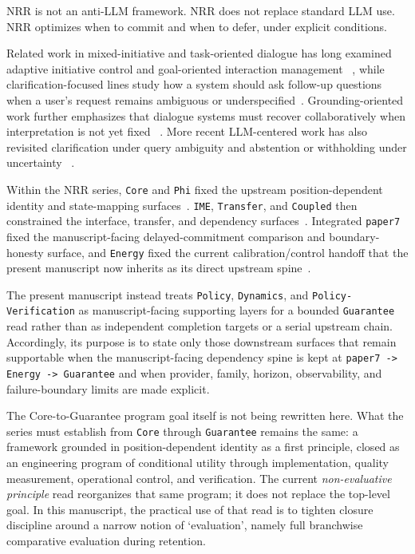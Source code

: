 \documentclass[11pt]{article}
\begin{document}
NRR is not an anti-LLM framework. NRR does not replace standard LLM use. NRR
optimizes when to commit and when to defer, under explicit conditions.

Related work in mixed-initiative and task-oriented dialogue has long examined
adaptive initiative control and goal-oriented interaction management
~\cite{chucarroll2000mimic,wen2017taskdialogue}, while clarification-focused lines
study how a system should ask follow-up questions when a user's request remains
ambiguous or underspecified~\cite{deboni2003clarification,rao2018evpi,hu2020interactive}. Grounding-oriented work further emphasizes that dialogue systems
must recover collaboratively when interpretation is not yet fixed
~\cite{benotti2021groundedclarifications,benotti2021grounding}. More recent
LLM-centered work has also revisited clarification under query ambiguity and
abstention or withholding under uncertainty
~\cite{sahay-etal-2025-ask,wen-etal-2025-know,madhusudhan-etal-2025-llms}.

Within the NRR series, \texttt{Core} and \texttt{Phi} fixed the upstream
position-dependent identity and state-mapping surfaces~\cite{saito2025nrr,saito2026phi}.
\texttt{IME}, \texttt{Transfer}, and \texttt{Coupled} then constrained the
interface, transfer, and dependency surfaces~\cite{saito2026ime,saito2026transfer,saito2026coupled}.
Integrated \texttt{paper7} fixed the manuscript-facing delayed-commitment
comparison and boundary-honesty surface, and \texttt{Energy} fixed the current
calibration/control handoff that the present manuscript now inherits as its
direct upstream spine~\cite{saito2026principles,saito2026energy}.

The present manuscript instead treats \texttt{Policy}, \texttt{Dynamics}, and
\texttt{Policy-Verification} as manuscript-facing supporting layers for a
bounded \texttt{Guarantee} read rather than as independent completion targets
or a serial upstream chain. Accordingly, its purpose is to state only those
downstream surfaces that remain supportable when the manuscript-facing
dependency spine is kept at \texttt{paper7 -> Energy -> Guarantee} and when
provider, family, horizon, observability, and failure-boundary limits are made
explicit.

The Core-to-Guarantee program goal itself is not being rewritten here. What the
series must establish from \texttt{Core} through \texttt{Guarantee} remains the
same: a framework grounded in position-dependent identity as a first principle,
closed as an engineering program of conditional utility through
implementation, quality measurement, operational control, and verification. The
current \textit{non-evaluative principle} read reorganizes that same program; it
does not replace the top-level goal. In this manuscript, the practical use of
that read is to tighten closure discipline around a narrow notion of
`evaluation', namely full branchwise comparative evaluation during retention.
\end{document}
